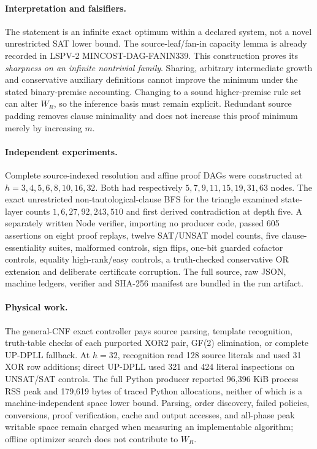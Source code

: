 \documentclass[11pt]{article}
\begin{document}
\paragraph{Interpretation and falsifiers.} The statement is an infinite exact optimum within a declared system, not a novel unrestricted SAT lower bound. The source-leaf/fan-in capacity lemma is already recorded in LSPV-2 MINCOST-DAG-FANIN339. This construction proves its \emph{sharpness on an infinite nontrivial family}. Sharing, arbitrary intermediate growth and conservative auxiliary definitions cannot improve the minimum under the stated binary-premise accounting. Changing to a sound higher-premise rule set can alter \(W_R\), so the inference basis must remain explicit. Redundant source padding removes clause minimality and does not increase this proof minimum merely by increasing \(m\).
\paragraph{Independent experiments.} Complete source-indexed resolution and affine proof DAGs were constructed at \(h=3,4,5,6,8,10,16,32\). Both had respectively \(5,7,9,11,15,19,31,63\) nodes. The exact unrestricted non-tautological-clause BFS for the triangle examined state-layer counts \(1,6,27,92,243,510\) and first derived contradiction at depth five. A separately written Node verifier, importing no producer code, passed 605 assertions on eight proof replays, twelve SAT/UNSAT model counts, five clause-essentiality suites, malformed controls, sign flips, one-bit guarded cofactor controls, equality high-rank/easy controls, a truth-checked conservative OR extension and deliberate certificate corruption. The full source, raw JSON, machine ledgers, verifier and SHA-256 manifest are bundled in the run artifact.
\paragraph{Physical work.} The general-CNF exact controller pays source parsing, template recognition, truth-table checks of each purported XOR2 pair, GF(2) elimination, or complete UP-DPLL fallback. At \(h=32\), recognition read 128 source literals and used 31 XOR row additions; direct UP-DPLL used 321 and 424 literal inspections on UNSAT/SAT controls. The full Python producer reported 96,396 KiB process RSS peak and 179,619 bytes of traced Python allocations, neither of which is a machine-independent space lower bound. Parsing, order discovery, failed policies, conversions, proof verification, cache and output accesses, and all-phase peak writable space remain charged when measuring an implementable algorithm; offline optimizer search does not contribute to \(W_R\).
\end{document}
